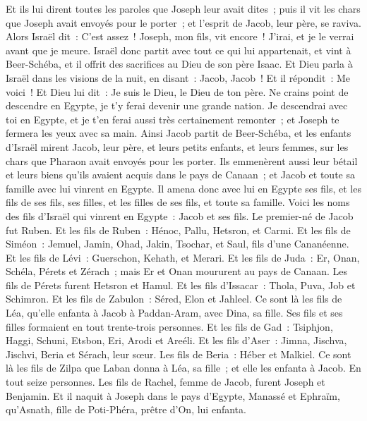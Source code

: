 \begin{multicols}{2}
Et ils lui dirent toutes les paroles que Joseph leur avait dites~; puis il vit les chars que Joseph avait envoyés pour le porter~; et l'esprit de Jacob, leur père, se raviva.
Alors Israël dit~: C'est assez~! Joseph, mon fils, vit encore~! J'irai, et je le verrai avant que je meure.
\VerseOne{}Israël donc partit avec tout ce qui lui appartenait, et vint à Beer-Schéba, et il offrit des sacrifices au Dieu de son père Isaac.
Et Dieu parla à Israël dans les visions de la nuit, en disant~: Jacob, Jacob~! Et il répondit~: Me voici~!
Et Dieu lui dit~: Je suis le Dieu, le Dieu de ton père. Ne crains point de descendre en Egypte, je t'y ferai devenir une grande nation.
Je descendrai avec toi en Egypte, et je t'en ferai aussi très certainement remonter~; et Joseph te fermera les yeux avec sa main.
Ainsi Jacob partit de Beer-Schéba, et les enfants d'Israël mirent Jacob, leur père, et leurs petits enfants, et leurs femmes, sur les chars que Pharaon avait envoyés pour les porter.
Ils emmenèrent aussi leur bétail et leurs biens qu'ils avaient acquis dans le pays de Canaan~; et Jacob et toute sa famille avec lui vinrent en Egypte.
Il amena donc avec lui en Egypte ses fils, et les fils de ses fils, ses filles, et les filles de ses fils, et toute sa famille.
Voici les noms des fils d'Israël qui vinrent en Egypte~: Jacob et ses fils. Le premier-né de Jacob fut Ruben.
Et les fils de Ruben~: Hénoc, Pallu, Hetsron, et Carmi.
Et les fils de Siméon~: Jemuel, Jamin, Ohad, Jakin, Tsochar, et Saul, fils d'une Cananéenne.
Et les fils de Lévi~: Guerschon, Kehath, et Merari.
Et les fils de Juda~: Er, Onan, Schéla, Pérets et Zérach~; mais Er et Onan moururent au pays de Canaan. Les fils de Pérets furent Hetsron et Hamul.
Et les fils d'Issacar~: Thola, Puva, Job et Schimron.
Et les fils de Zabulon~: Séred, Elon et Jahleel.
Ce sont là les fils de Léa, qu'elle enfanta à Jacob à Paddan-Aram, avec Dina, sa fille. Ses fils et ses filles formaient en tout trente-trois personnes.
Et les fils de Gad~: Tsiphjon, Haggi, Schuni, Etsbon, Eri, Arodi et Areéli.
Et les fils d'Aser~: Jimna, Jischva, Jischvi, Beria et Sérach, leur sœur. Les fils de Beria~: Héber et Malkiel.
Ce sont là les fils de Zilpa que Laban donna à Léa, sa fille~; et elle les enfanta à Jacob. En tout seize personnes.
Les fils de Rachel, femme de Jacob, furent Joseph et Benjamin.
Et il naquit à Joseph dans le pays d'Egypte, Manassé et Ephraïm, qu'Asnath, fille de Poti-Phéra, prêtre d'On, lui enfanta.

\end{multicols}
